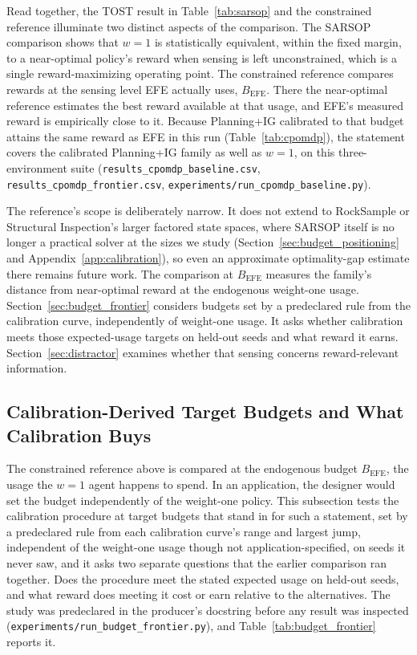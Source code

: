 Read together, the TOST result in Table~\ref{tab:sarsop} and the constrained reference illuminate two distinct aspects of the comparison. The SARSOP comparison shows that $w{=}1$ is statistically equivalent, within the fixed margin, to a near-optimal policy's reward when sensing is left unconstrained, which is a single reward-maximizing operating point. The constrained reference compares rewards at the sensing level EFE actually uses, $B_{\mathrm{EFE}}$. There the near-optimal reference estimates the best reward available at that usage, and EFE's measured reward is empirically close to it. Because Planning+IG calibrated to that budget attains the same reward as EFE in this run (Table~\ref{tab:cpomdp}), the statement covers the calibrated Planning+IG family as well as $w{=}1$, on this three-environment suite (\texttt{results\_\allowbreak cpomdp\_\allowbreak baseline.csv}, \texttt{results\_\allowbreak cpomdp\_\allowbreak frontier.csv}, \texttt{experiments/\allowbreak run\_\allowbreak cpomdp\_\allowbreak baseline.py}).

The reference's scope is deliberately narrow. It does not extend to RockSample or Structural Inspection's larger factored state spaces, where SARSOP itself is no longer a practical solver at the sizes we study (Section~\ref{sec:budget_positioning} and Appendix~\ref{app:calibration}), so even an approximate optimality-gap estimate there remains future work. The comparison at $B_{\mathrm{EFE}}$ measures the family's distance from near-optimal reward at the endogenous weight-one usage. Section~\ref{sec:budget_frontier} considers budgets set by a predeclared rule from the calibration curve, independently of weight-one usage. It asks whether calibration meets those expected-usage targets on held-out seeds and what reward it earns. Section~\ref{sec:distractor} examines whether that sensing concerns reward-relevant information.

\subsection{Calibration-Derived Target Budgets and What Calibration Buys}
\label{app:frontier_details}

The constrained reference above is compared at the endogenous budget $B_{\mathrm{EFE}}$, the usage the $w{=}1$ agent happens to spend. In an application, the designer would set the budget independently of the weight-one policy. This subsection tests the calibration procedure at target budgets that stand in for such a statement, set by a predeclared rule from each calibration curve's range and largest jump, independent of the weight-one usage though not application-specified, on seeds it never saw, and it asks two separate questions that the earlier comparison ran together. Does the procedure meet the stated expected usage on held-out seeds, and what reward does meeting it cost or earn relative to the alternatives. The study was predeclared in the producer's docstring before any result was inspected (\texttt{experiments/\allowbreak run\_\allowbreak budget\_\allowbreak frontier.py}), and Table~\ref{tab:budget_frontier} reports it.

